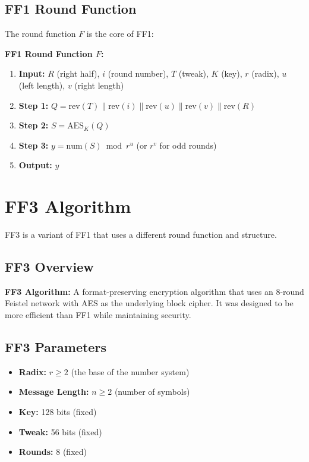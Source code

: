 \documentclass[11pt,a4paper]{article}
\begin{document}
\subsection{FF1 Round Function}

The round function $F$ is the core of FF1:

\begin{mathbox}
\textbf{FF1 Round Function $F$:}
\begin{enumerate}
    \item \textbf{Input:} $R$ (right half), $i$ (round number), $T$ (tweak), $K$ (key), $r$ (radix), $u$ (left length), $v$ (right length)
    \item \textbf{Step 1:} $Q = \text{rev}(T) \parallel \text{rev}(i) \parallel \text{rev}(u) \parallel \text{rev}(v) \parallel \text{rev}(R)$
    \item \textbf{Step 2:} $S = \text{AES}_K(Q)$
    \item \textbf{Step 3:} $y = \text{num}(S) \bmod r^u$ (or $r^v$ for odd rounds)
    \item \textbf{Output:} $y$
\end{enumerate}
\end{mathbox}

\section{FF3 Algorithm}

FF3 is a variant of FF1 that uses a different round function and structure.

\subsection{FF3 Overview}

\begin{definitionbox}
\textbf{FF3 Algorithm:} A format-preserving encryption algorithm that uses an 8-round Feistel network with AES as the underlying block cipher. It was designed to be more efficient than FF1 while maintaining security.
\end{definitionbox}

\subsection{FF3 Parameters}

\begin{itemize}
    \item \textbf{Radix:} $r \geq 2$ (the base of the number system)
    \item \textbf{Message Length:} $n \geq 2$ (number of symbols)
    \item \textbf{Key:} 128 bits (fixed)
    \item \textbf{Tweak:} 56 bits (fixed)
    \item \textbf{Rounds:} 8 (fixed)
\end{itemize}
\end{document}
